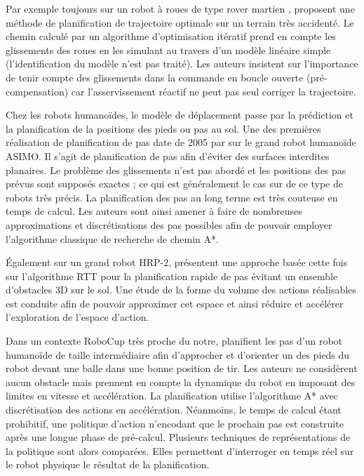Par exemple toujours sur un robot à roues de type 
\og rover martien \fg, \cite{howard_optimal_2007} proposent une
méthode de planification de trajectoire optimale sur un terrain 
très accidenté.
Le chemin calculé par un algorithme d'optimisation itératif prend
en compte les glissements des roues en les simulant au travers d'un modèle
linéaire simple (l'identification du modèle n'est pas traité).
Les auteurs insistent sur l'importance de tenir compte des glissements
dans la commande en boucle ouverte (pré-compensation) car l'asservissement 
réactif ne peut pas seul corriger la trajectoire.

Chez les robots humanoïdes, le modèle de déplacement passe
par la prédiction et la planification de la positions des pieds 
ou pas au sol.
Une des premières réalisation de planification de pas 
date de 2005 par \cite{chestnutt_footstep_2005} sur le grand 
robot humanoïde ASIMO.
Il s'agit de planification de pas afin d'éviter des surfaces 
interdites planaires. Le problème des glissements n'est pas abordé
et les positions des pas prévus sont supposés exactes ; ce qui est
généralement le cas sur de ce type de robots très précis.
La planification des pas au long terme est très couteuse en temps
de calcul. Les auteurs sont ainsi amener à faire de nombreuses approximations 
et discrétisations des pas possibles afin de pouvoir employer 
l'algorithme classique de recherche de chemin A*.

Également sur un grand robot HRP-2, \cite{perrin_fast_2012} présentent
une approche basée cette fois sur l'algorithme RTT pour la planification 
rapide de pas évitant un ensemble d'obstacles 3D sur le sol.
Une étude de la forme du volume des actions réalisables est conduite afin
de pouvoir approximer cet espace et ainsi réduire et accélérer l'exploration
de l'espace d'action.

Dans un contexte RoboCup très proche du notre, \cite{schmitz_real-time_2012}
planifient les pas d'un robot humanoïde de taille intermédiaire afin 
d'approcher et d'orienter un des pieds du robot devant une balle dans
une bonne position de tir.
Les auteurs ne considèrent aucun obstacle mais prennent en compte la dynamique
du robot en imposant des limites en vitesse et accélération.
La planification utilise l'algorithme A* avec discrétisation des actions 
en accélération. 
Néanmoins, le temps de calcul étant prohibitif, une politique
d'action n'encodant que le prochain pas est construite après une
longue phase de pré-calcul.
Plusieurs techniques de représentations de la politique sont alors 
comparées. Elles permettent d'interroger en temps réel 
sur le robot physique le résultat de la planification.


